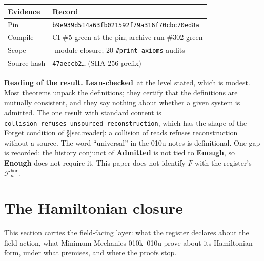 \documentclass[11pt,a4paper]{article}
\newcommand{\bs}[1]{\texttt{#1}}
\newcommand{\st}[1]{\textsf{\small\textbf{#1}}}
\newcommand{\Slean}{\st{Lean-checked}}\newcommand{\Scond}{\st{Conditional}}
\theoremstyle{plain}
\theoremstyle{definition}
\theoremstyle{remark}
\begin{document}
\begin{center}\small
\begin{tabularx}{\linewidth}{@{}>{\raggedright\arraybackslash}p{3.1cm}>{\raggedright\arraybackslash}X@{}}
\toprule
Evidence & Record\\\midrule
Pin & \texttt{b9e939d514a63fb021592f79a316f70cbc70ed8a}\\
Compile & CI \#5 green at the pin; archive run \#302 green\\
Scope & 45-module closure; 20 \texttt{\#print axioms} audits\\
Source hash & \texttt{47aeccb2\dots} (SHA-256 prefix)\\\bottomrule
\end{tabularx}
\end{center}
\textbf{Reading of the result.} \Slean\ at the level stated, which is modest. Most theorems unpack the definitions; they certify that the definitions are mutually consistent, and they say nothing about whether a given system is admitted. The one result with standard content is \bs{collision\_refuses\_unsourced\_reconstruction}, which has the shape of the Forget condition of \S\ref{sec:reader}: a collision of reads refuses reconstruction without a source. The word ``universal'' in the 010u notes is definitional. One gap is recorded: the history conjunct of \textbf{Admitted} is not tied to \textbf{Enough}, so \textbf{Enough} does not require it. This paper does not identify $F$ with the register's $\mathcal F^{\mathrm{hor}}_n$.

\section{The Hamiltonian closure}\label{sec:field}
This section carries the field-facing layer: what the register declares about the field action, what Minimum Mechanics 010k--010u prove about its Hamiltonian form, under what premises, and where the proofs stop.
\end{document}
